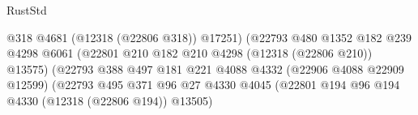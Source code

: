 \begin{lexlean}{RustStd}
\begin{coremodule}
                                                        @318
                                                        @4681
                                                        (@12318 (@22806 @318))
                                                        @17251)
                                                      (@22793
                                                        @480
                                                        @1352
                                                        @182
                                                        @239
                                                        @4298
                                                        @6061
                                                        (@22801
                                                          @210
                                                          @182
                                                          @210
                                                          @4298
                                                          (@12318 (@22806 @210))
                                                          @13575)
                                                        (@22793
                                                          @388
                                                          @497
                                                          @181
                                                          @221
                                                          @4088
                                                          @4332
                                                          (@22906 @4088 @22909 @12599)
                                                          (@22793
                                                            @495
                                                            @371
                                                            @96
                                                            @27
                                                            @4330
                                                            @4045
                                                            (@22801
                                                              @194
                                                              @96
                                                              @194
                                                              @4330
                                                              (@12318 (@22806 @194))
                                                              @13505)

\end{coremodule}
\end{lexlean}
